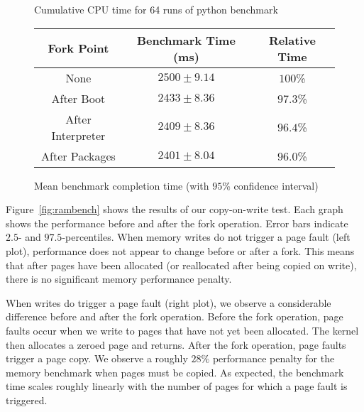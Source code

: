 \pgfplotsset{compat=1.5}
\begin{figure*}
  \center
  \label{fig:pybench}
\caption{Cumulative CPU time for 64 runs of python benchmark}
\label{fig:pycpu}
\end{figure*}

\begin{figure*}
  \center
  \begin{tabular}{|c|c|c|}
    \hline
    Fork Point & Benchmark Time (ms) & Relative Time \\ \hline
    None & $2500 \pm 9.14$ & $100$\% \\ \hline
    After Boot & $2433 \pm 8.36$ & $97.3$\% \\ \hline
    After Interpreter & $2409 \pm 8.36$ & $96.4$\% \\ \hline
    After Packages & $2401 \pm 8.04$ & $96.0$\% \\ \hline
  \end{tabular}

  \caption{Mean benchmark completion time (with $95$\% confidence interval)}
  \label{fig:pybench}
\end{figure*}


 Figure~\ref{fig:rambench} shows the results
of our copy-on-write test. Each graph shows the performance before and after
the fork operation. Error bars indicate $2.5$- and $97.5$-percentiles. When
memory writes do not trigger a page fault (left plot), performance does not
appear to change before or after a fork. This means that after pages have
been allocated (or reallocated after being copied on write), there is no
significant memory performance penalty.

When writes do trigger a page fault (right plot), we observe a considerable
difference before and after the fork operation. Before the fork operation, page
faults occur when we write to pages that have not yet been allocated. The
kernel then allocates a zeroed page and returns. After the fork operation, page
faults trigger a page copy. We observe a roughly $28\%$ performance penalty for
the memory benchmark when pages must be copied. As expected, the benchmark time
scales roughly linearly with the number of pages for which a page fault is
triggered.

